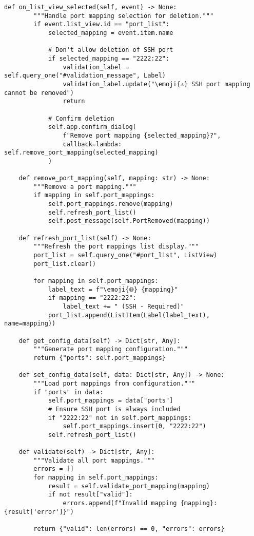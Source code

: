 \documentclass[11pt,a4paper]{article}
\newcommand{\emoji}[1]{{\emojifont #1}}
\begin{document}
\begin{lstlisting}[caption={ValidatedInput Implementation}]
    def on_list_view_selected(self, event) -> None:
        """Handle port mapping selection for deletion."""
        if event.list_view.id == "port_list":
            selected_mapping = event.item.name
            
            # Don't allow deletion of SSH port
            if selected_mapping == "2222:22":
                validation_label = self.query_one("#validation_message", Label)
                validation_label.update("\emoji{⚠} SSH port mapping cannot be removed")
                return
                
            # Confirm deletion
            self.app.confirm_dialog(
                f"Remove port mapping {selected_mapping}?",
                callback=lambda: self.remove_port_mapping(selected_mapping)
            )
            
    def remove_port_mapping(self, mapping: str) -> None:
        """Remove a port mapping."""
        if mapping in self.port_mappings:
            self.port_mappings.remove(mapping)
            self.refresh_port_list()
            self.post_message(self.PortRemoved(mapping))
            
    def refresh_port_list(self) -> None:
        """Refresh the port mappings list display."""
        port_list = self.query_one("#port_list", ListView)
        port_list.clear()
        
        for mapping in self.port_mappings:
            label_text = f"\emoji{🌐} {mapping}"
            if mapping == "2222:22":
                label_text += " (SSH - Required)"
            port_list.append(ListItem(Label(label_text), name=mapping))
            
    def get_config_data(self) -> Dict[str, Any]:
        """Generate port mapping configuration."""
        return {"ports": self.port_mappings}
        
    def set_config_data(self, data: Dict[str, Any]) -> None:
        """Load port mappings from configuration."""
        if "ports" in data:
            self.port_mappings = data["ports"]
            # Ensure SSH port is always included
            if "2222:22" not in self.port_mappings:
                self.port_mappings.insert(0, "2222:22")
            self.refresh_port_list()
            
    def validate(self) -> Dict[str, Any]:
        """Validate all port mappings."""
        errors = []
        for mapping in self.port_mappings:
            result = self.validate_port_mapping(mapping)
            if not result["valid"]:
                errors.append(f"Invalid mapping {mapping}: {result['error']}")
                
        return {"valid": len(errors) == 0, "errors": errors}
\end{lstlisting}
\end{document}
